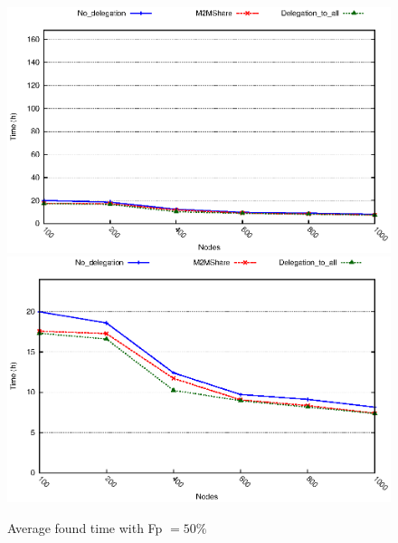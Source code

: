 \begin{figure}[htbp]
\centering%
\subfigure%
{\includegraphics{grafici/tempiVF_Fp50.eps}}\qquad\qquad
\subfigure%
{\includegraphics{grafici/tempiVF_Fp50_zoom.eps}}
\caption{Average found time with Fp $= 50\%$\label{graficiTempiVF_Fp50}}
\end{figure}



\newpage
